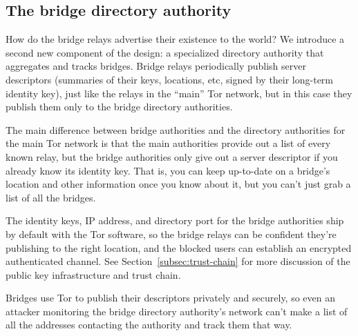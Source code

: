 \documentclass{llncs}
\begin{document}
\subsection{The bridge directory authority}

How do the bridge relays advertise their existence to the world? We
introduce a second new component of the design: a specialized directory
authority that aggregates and tracks bridges. Bridge relays periodically
publish server descriptors (summaries of their keys, locations, etc,
signed by their long-term identity key), just like the relays in the
``main'' Tor network, but in this case they publish them only to the
bridge directory authorities.

The main difference between bridge authorities and the directory
authorities for the main Tor network is that the main authorities provide
out a list of every known relay, but the bridge authorities only give
out a server descriptor if you already know its identity key. That is,
you can keep up-to-date on a bridge's location and other information
once you know about it, but you can't just grab a list of all the bridges.

The identity keys, IP address, and directory port for the bridge
authorities ship by default with the Tor software, so the bridge relays
can be confident they're publishing to the right location, and the
blocked users can establish an encrypted authenticated channel. See
Section~\ref{subsec:trust-chain} for more discussion of the public key
infrastructure and trust chain.

Bridges use Tor to publish their descriptors privately and securely,
so even an attacker monitoring the bridge directory authority's network
can't make a list of all the addresses contacting the authority and
track them that way.

%
%
%
%
%
\end{document}
